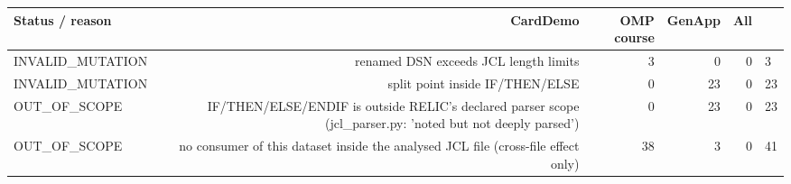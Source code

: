 \begin{tabular}{lrrrr}
\toprule
Status / reason & CardDemo & OMP course & GenApp & All \\
\midrule
INVALID\_MUTATION & renamed DSN exceeds JCL length limits & 3 & 0 & 0 & 3 \\
INVALID\_MUTATION & split point inside IF/THEN/ELSE & 0 & 23 & 0 & 23 \\
OUT\_OF\_SCOPE & IF/THEN/ELSE/ENDIF is outside RELIC's declared parser scope (jcl\_parser.py: 'noted but not deeply parsed') & 0 & 23 & 0 & 23 \\
OUT\_OF\_SCOPE & no consumer of this dataset inside the analysed JCL file (cross-file effect only) & 38 & 3 & 0 & 41 \\
\bottomrule
\end{tabular}
